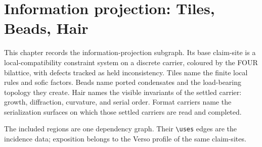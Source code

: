 \chapter{Information projection: Tiles, Beads, Hair}\label{ch:textile}

This chapter records the information-projection subgraph.  Its base claim-site is a
local-compatibility constraint system on a discrete carrier, coloured by the FOUR
bilattice, with defects tracked as held inconsistency.  Tiles name the finite
local rules and sofic factors.  Beads name ported condensates and the
load-bearing topology they create.  Hair names the visible invariants of the
settled carrier: growth, diffraction, curvature, and serial order.  Format
carriers name the serialization surfaces on which those settled carriers are
read and completed.

The included regions are one dependency graph.  Their
\texttt{\textbackslash uses} edges are the incidence data; exposition belongs to the
Verso profile of the same claim-sites.






